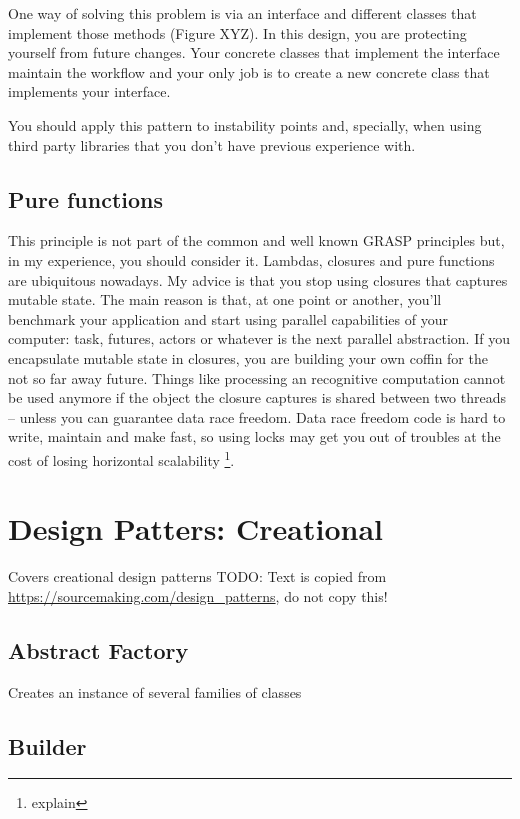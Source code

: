 \documentclass[]{article}
\let\rmarkdownfootnote\footnote%
\def\footnote{\protect\rmarkdownfootnote}
\begin{document}
One way of solving this problem is via an interface and different
classes that implement those methods (Figure XYZ). In this design, you
are protecting yourself from future changes. Your concrete classes that
implement the interface maintain the workflow and your only job is to
create a new concrete class that implements your interface.

You should apply this pattern to instability points and, specially, when
using third party libraries that you don't have previous experience
with.

\subsection{Pure functions}\label{pure-functions}

This principle is not part of the common and well known GRASP principles
but, in my experience, you should consider it. Lambdas, closures and
pure functions are ubiquitous nowadays. My advice is that you stop using
closures that captures mutable state. The main reason is that, at one
point or another, you'll benchmark your application and start using
parallel capabilities of your computer: task, futures, actors or
whatever is the next parallel abstraction. If you encapsulate mutable
state in closures, you are building your own coffin for the not so far
away future. Things like processing an recognitive computation cannot be
used anymore if the object the closure captures is shared between two
threads -- unless you can guarantee data race freedom. Data race freedom
code is hard to write, maintain and make fast, so using locks may get
you out of troubles at the cost of losing horizontal scalability
\footnote{explain}.

\section{Design Patters: Creational}\label{design-patters-creational}

Covers creational design patterns TODO: Text is copied from
\url{https://sourcemaking.com/design_patterns}, do not copy this!

\subsection{Abstract Factory}\label{abstract-factory}

Creates an instance of several families of classes

\subsection{Builder}\label{builder}
\end{document}
